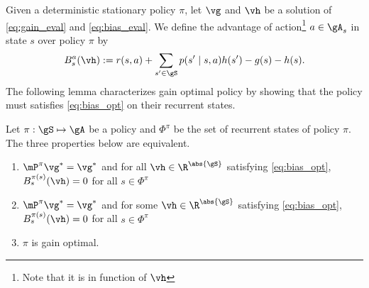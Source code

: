 Given a deterministic stationary policy $\pi$, let $\vg$ and $\vh$ be a solution of \eqref{eq:gain_eval} and \eqref{eq:bias_eval}.
We define the advantage of action\footnote{Note that it is in function of $\vh$} $a\in\gA_s$ in state $s$ over policy $\pi$ by
\begin{equation}
    \label{eq:advan}
    B^a_s(\vh) := r(s,a) +\sum_{s'\in\gS}p(s'\mid s,a)h(s') -g(s) -h(s).
\end{equation}
The following lemma characterizes gain optimal policy by showing that the policy must satisfies \eqref{eq:bias_opt} on their recurrent states.
\begin{lem}
    \label{lem:opt_pol}
    Let $\pi:\gS\mapsto\gA$ be a policy and $\Phi^\pi$ be the set of recurrent states of policy $\pi$.
    The three properties below are equivalent.
    \begin{enumerate}[label=(\roman*)]
        \item \label{it:opt_pol1} $\mP^\pi\vg^*=\vg^*$ and for all $\vh\in \R^{\abs{\gS}}$ satisfying \eqref{eq:bias_opt}, $B^{\pi(s)}_s(\vh)=0$ for all $s\in\Phi^\pi$
        \item \label{it:opt_pol2} $\mP^\pi\vg^*=\vg^*$ and for some $\vh\in \R^{\abs{\gS}}$ satisfying \eqref{eq:bias_opt}, $B^{\pi(s)}_s(\vh)=0$ for all $s\in\Phi^\pi$
        \item \label{it:opt_pol3} $\pi$ is gain optimal.
    \end{enumerate}
\end{lem}
